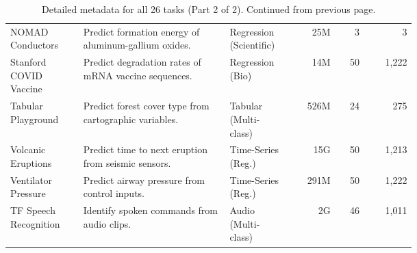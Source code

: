 \begin{table}[t!]
\begin{tabular}{
        >{\raggedright\arraybackslash}p{0.18\linewidth} 
        >{\raggedright\arraybackslash}p{0.36\linewidth} 
        >{\raggedright\arraybackslash}p{0.15\linewidth} 
        r r r
    }
    NOMAD Conductors & Predict formation energy of aluminum-gallium oxides. & Regression (Scientific) & 25M & 3 & 3 \\ \addlinespace
    
    Stanford COVID Vaccine & Predict degradation rates of mRNA vaccine sequences. & Regression (Bio) & 14M & 50 & 1,222 \\ \addlinespace
    
    Tabular Playground & Predict forest cover type from cartographic variables. & Tabular (Multi-class) & 526M & 24 & 275 \\ \addlinespace
    
    Volcanic Eruptions & Predict time to next eruption from seismic sensors. & Time-Series (Reg.) & 15G & 50 & 1,213 \\ \addlinespace
    
    Ventilator Pressure & Predict airway pressure from control inputs. & Time-Series (Reg.) & 291M & 50 & 1,222 \\ \addlinespace
    
    TF Speech Recognition & Identify spoken commands from audio clips. & Audio (Multi-class) & 2G & 46 & 1,011 \\ 
    \bottomrule
    \end{tabular}
    
    \addtocounter{table}{-1}
    
    \caption{Detailed metadata for all 26 tasks (Part 2 of 2). Continued from previous page.}
    \label{tab:appendix_task_details_part2}
    
\end{table}